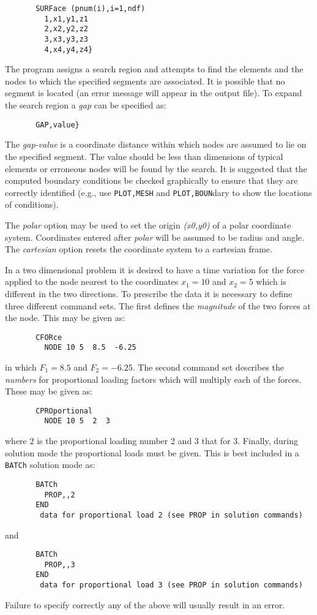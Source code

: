 \begin{verbatim}
       SURFace (pnum(i),i=1,ndf)
         1,x1,y1,z1
         2,x2,y2,z2
         3,x3,y3,z3
         4,x4,y4,z4}
\end{verbatim}

The program assigns a search region and attempts to
find the elements and the nodes to which the specified
segments are associated.  It is possible that no segment
is located (an error message will appear in the output file).  To
expand the search region a {\it gap} can be specified as:

\begin{verbatim}
       GAP,value}
\end{verbatim}
The {\it gap-value} is a coordinate distance within which
nodes are assumed to lie on the specified segment. The
value should be less than dimensions of typical elements
or erroneous nodes will be found by the search.
It is suggested that the computed boundary conditions
be checked graphically to ensure that they are
correctly identified (e.g., use {\tt PLOT,MESH} and {\tt PLOT,BOUN}dary
to show the locations of conditions).

The {\it polar} option may be used to set the origin {\it (x0,y0)} of a
polar coordinate system. Coordinates entered after
{\it polar} will be assumed to be radius and angle.  The
{\it cartesian} option resets the coordinate system to a
cartesian frame.


In a two dimensional problem it is desired to have a time variation for
the force applied to the node nearest to the coordinates $x_1 = 10$ and
$x_2 = 5$ which is different in the two directions.  To prescribe the data
it is necessary to define three different command sets.  The first defines
the \textit{magnitude} of the two forces at the node.  This may be given
as:
\begin{verbatim}
       CFORce
         NODE 10 5  8.5  -6.25

\end{verbatim}
in which $F_1 = 8.5$ and $F_2 = -6.25$.  The second command set describes the
\textit{numbers} for proportional loading factors which will multiply each of
the forces.  These may be given as:
\begin{verbatim}
       CPROportional
         NODE 10 5  2  3

\end{verbatim}
where $2$ is the proportional loading number 2 and $3$ that for 3.  Finally,
during solution mode the proportional loads must be given.  This is best
included in a \texttt{BATCh} solution mode as:
\begin{verbatim}
       BATCh
         PROP,,2
       END
        data for proportional load 2 (see PROP in solution commands)
\end{verbatim}
and
\begin{verbatim}
       BATCh
         PROP,,3
       END
        data for proportional load 3 (see PROP in solution commands)
\end{verbatim}
Failure to specify correctly any of the above will usually result in an error.
\vfil\eject

